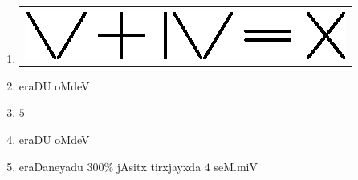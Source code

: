 \begin{enumerate}
\item 
\begin{tabular}[c]{c}
\centering
\includegraphics{src/figures/ans43.eps}
\end{tabular}

\item eraDU oMdeV

\item  $5$

\item eraDU oMdeV 

\item eraDaneyadu $300\%$ jAsitx tirxjayxda $4$ seM.miV
 
\end{enumerate}
